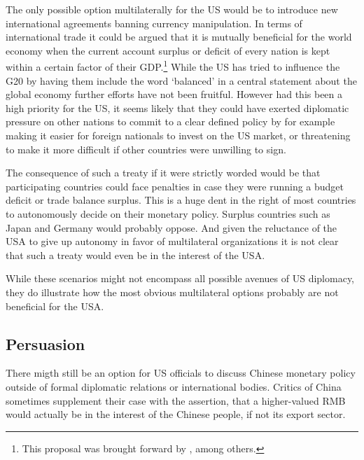The only possible option multilaterally for the US would be to introduce 
new international agreements banning currency manipulation. In terms of 
international trade it could be argued that it is mutually beneficial 
for the world economy when the current account surplus or deficit of 
every nation is kept within a certain factor of their GDP.\footnote{This 
proposal was brought forward by \cite{Cline2009}, among others.} While 
the US has tried to influence the G20 by having them include the word 
`balanced' in a central statement about the global economy further 
efforts have not been fruitful. However had this been a high priority 
for the US, it seems likely that they could have exerted diplomatic 
pressure on other nations to commit to a clear defined policy by for 
example making it easier for foreign nationals to invest on the US 
market, or threatening to make it more difficult if other countries were 
unwilling to sign.

The consequence of such a treaty if it were strictly worded would be 
that participating countries could face penalties in case they were 
running a budget deficit or trade balance surplus.  This is a huge dent 
in the right of most countries to autonomously decide on their monetary 
policy. Surplus countries such as Japan and Germany would probably oppose. And given the reluctance of the USA to give up autonomy in favor of multilateral organizations it is not clear that such a treaty 
would even be in the interest of the USA.

While these scenarios might not encompass all possible avenues of US diplomacy, they do illustrate how the most obvious 
multilateral options probably are not beneficial for the USA.


\subsection{Persuasion}

There migth still be an option for US officials to discuss Chinese monetary policy outside of formal diplomatic relations or international bodies. Critics of China sometimes supplement their case with the assertion, 
that a higher-valued RMB would actually be in the interest of the 
Chinese people, if not its export sector.

